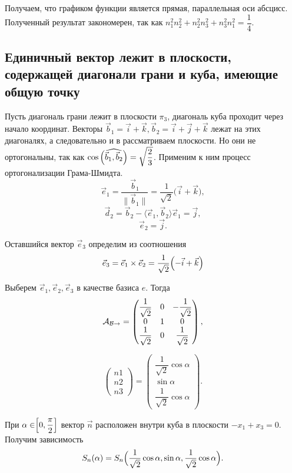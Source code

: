 \documentclass[12pt,a4paper]{article}
\begin{document}
 Получаем, что графиком функции является прямая, параллельная оси абсцисс. Полученный результат закономерен, так как $n_1^2 n_2^2 + n_2^2 n_3^2 + n_3^2 n_1^2 = \dfrac{1}{4}$.

 \subsection{Единичный вектор лежит в плоскости, содержащей диагонали грани и куба, имеющие общую точку}

 Пусть диагональ грани лежит в плоскости $\pi_3$, диагональ куба проходит через начало координат. Векторы $\vec b_1 = \vec i + \vec k, \vec b_2 = \vec i + \vec j + \vec k$ лежат на этих диагоналях, а следовательно и в рассматриваем плоскости. Но они не ортогональны, так как $ \cos{\Bigl(\widehat{\vec b_1, \vec b_2}\Bigr)} = \sqrt{\dfrac{2}{3}} $. Применим к ним процесс ортогонализации Грама-Шмидта.
 \[
	\vec e_1 = \dfrac{\vec b_1}{\| \vec b_1 \|} = \dfrac{1}{\sqrt 2}\bigl( \vec i + \vec k \bigr),
 \]
 \[
	\vec d_2 = \vec b_2 - \langle \vec e_1, \vec b_2 \rangle \vec e_1 = \vec j,
 \]
 \[
 	\vec e_2 = \vec j.
 \]

 Оставшийся вектор $\vec e_3$ определим из соотношения
 \[
	\vec e_3 = \vec e_1 \times \vec e_2 = \dfrac{1}{\sqrt 2}\Bigl( -\vec i + \vec k \Bigr)
 \]

 Выберем $\vec e_1, \vec e_2, \vec e_3 $ в качестве базиса $e$. Тогда
 \[
	\mathcal A_{\mathcal B \rightarrow \mathcal {\relax}} = 
	\begin{pmatrix}
		\dfrac{1}{\sqrt 2} & 0 & -\dfrac{1}{\sqrt 2} \\ 
		0 & 1 & 0 \\
		\dfrac{1}{\sqrt 2} & 0 & \dfrac{1}{\sqrt 2}
	\end{pmatrix},
 \]

 \[
	\begin{pmatrix}
		n1 \\
		n2 \\
		n3	
	\end{pmatrix} = \begin{pmatrix}
		\dfrac{1}{\sqrt 2} \cos \alpha \\
		\sin \alpha \\
		\dfrac{1}{\sqrt 2} \cos \alpha
	\end{pmatrix}.
 \]

 При $\alpha \in \Bigr[ 0, \dfrac{\pi}{2} \Bigl]$ вектор $ \vec n $ расположен внутри куба в плоскости $ -x_1 + x_3 = 0 $. Получим зависимость 
 \[
	S_n(\alpha) = S_n \Bigl( \dfrac{1}{\sqrt 2} \cos \alpha, \sin \alpha, \dfrac{1}{\sqrt 2} \cos \alpha \Bigr).
 \] 
\end{document}
